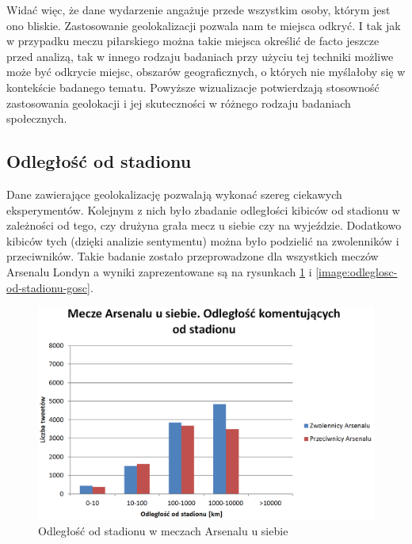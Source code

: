 Widać więc, że dane wydarzenie angażuje przede wszystkim osoby, którym jest ono
bliskie. Zastosowanie geolokalizacji pozwala nam te miejsca odkryć. I tak jak w
przypadku meczu piłarskiego można takie miejsca określić de facto jeszcze przed
analizą, tak w innego rodzaju badaniach przy użyciu tej techniki możliwe może
być odkrycie miejsc, obszarów geograficznych, o których nie myślałoby się w
kontekście badanego tematu. Powyższe wizualizacje potwierdzają stosowność
zastosowania geolokacji i jej skuteczności w różnego rodzaju badaniach
społecznych.

\subsection{Odległość od stadionu}
\label{subsection:odlegloscodstadionu}
Dane zawierające geolokalizację pozwalają wykonać szereg ciekawych eksperymentów.
Kolejnym z nich było zbadanie odległości kibiców od stadionu w zależności
od tego, czy drużyna grała mecz u siebie czy na wyjeździe. Dodatkowo
kibiców tych (dzięki analizie sentymentu) można było podzielić na zwolenników
i przeciwników. Takie badanie zostało przeprowadzone dla wszystkich meczów
Arsenalu Londyn a wyniki zaprezentowane są na rysunkach 
\ref{image:odleglosc-od-stadionu-gospodarz} i \ref{image:odleglosc-od-stadionu-gosc}.

\begin{figure}[ht!]
\centering
\includegraphics[width=140mm]{img/odleglosc-od-stadionu-home.PNG}
\caption{Odległość od stadionu w meczach Arsenalu u siebie}
\label{image:odleglosc-od-stadionu-gospodarz}
\end{figure}

\clearpage

